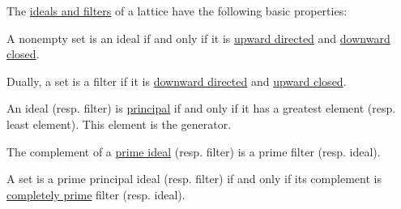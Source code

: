 \begin{proposition}\label{thm:def:lattice_ideal}
  The \hyperref[def:lattice_ideal]{ideals and filters} of a lattice have the following basic properties:
  \begin{thmenum}
     A nonempty set is an ideal if and only if it is \hyperref[def:directed_set]{upward directed} and \hyperref[def:closed_ordered_subset]{downward closed}.

    Dually, a set is a filter if it is \hyperref[def:directed_set]{downward directed} and \hyperref[def:closed_ordered_subset]{upward closed}.

     An ideal (resp. filter) is \hyperref[def:lattice_ideal/principal]{principal} if and only if it has a greatest element (resp. least element). This element is the generator.

     The complement of a \hyperref[def:lattice_ideal/prime]{prime ideal} (resp. filter) is a prime filter (resp. ideal).

     A set is a prime principal ideal (resp. filter) if and only if its complement is \hyperref[def:lattice_ideal/completely_prime]{completely prime} filter (resp. ideal).
  \end{thmenum}
\end{proposition}
